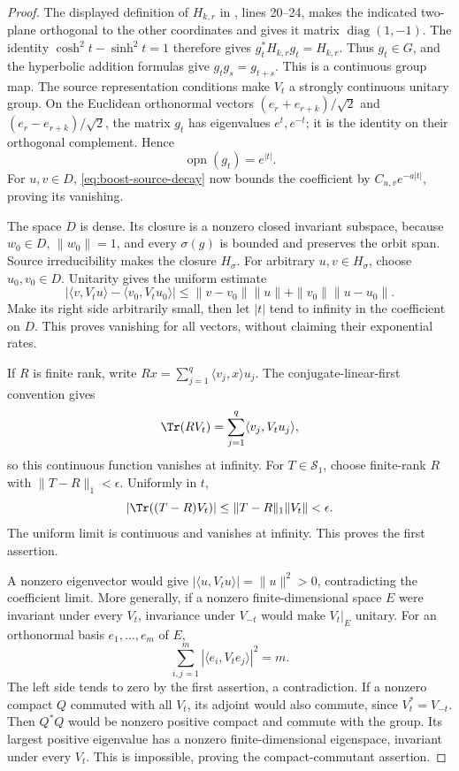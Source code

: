 \begin{proof}
The displayed definition of \(H_{k,r}\) in
, lines 20--24,
makes the indicated two-plane orthogonal to the other coordinates
and gives it matrix \(\operatorname{diag}(1,-1)\).
The identity \(\cosh^2t-\sinh^2t=1\) therefore gives
\(g_t^*H_{k,r}g_t=H_{k,r}\). Thus \(g_t\in G\), and the
hyperbolic addition formulas give \(g_tg_s=g_{t+s}\).
This is a continuous group map. The source representation
conditions make \(V_t\) a strongly continuous unitary group.
On the Euclidean orthonormal vectors
\((e_r+e_{r+k})/\sqrt2\) and
\((e_r-e_{r+k})/\sqrt2\), the matrix \(g_t\) has eigenvalues
\(e^t,e^{-t}\); it is the identity on their orthogonal
complement. Hence
\[
 \operatorname{opn}(g_t)=e^{|t|}.
\]
For \(u,v\in D\), \eqref{eq:boost-source-decay} now bounds the
coefficient by \(C_{u,v}e^{-a|t|}\), proving its vanishing.

The space \(D\) is dense. Its closure is a nonzero closed
invariant subspace, because \(w_0\in D\), \(\|w_0\|=1\),
and every \(\sigma(g)\) is bounded and preserves the orbit
span. Source irreducibility makes the closure \(H_\sigma\).
For arbitrary \(u,v\in H_\sigma\), choose \(u_0,v_0\in D\).
Unitarity gives the uniform estimate
\[
 |\langle v,V_tu\rangle-\langle v_0,V_tu_0\rangle|
 \le\|v-v_0\|\|u\|+\|v_0\|\|u-u_0\|.
\]
Make its right side arbitrarily small, then let \(|t|\) tend
to infinity in the coefficient on \(D\). This proves vanishing
for all vectors, without claiming their exponential rates.

If \(R\) is finite rank, write
\(Rx=\sum_{j=1}^q\langle v_j,x\rangle u_j\).
The conjugate-linear-first convention gives
\[
 \Tr(RV_t)=\sum_{j=1}^q\langle v_j,V_tu_j\rangle,
\]
so this continuous function vanishes at infinity.
For \(T\in\mathcal S_1\), choose finite-rank \(R\) with
\(\|T-R\|_1<\epsilon\). Uniformly in \(t\),
\[
 |\Tr((T-R)V_t)|\le\|T-R\|_1\|V_t\|<\epsilon.
\]
The uniform limit is continuous and vanishes at infinity.
This proves the first assertion.

A nonzero eigenvector would give
\(|\langle u,V_tu\rangle|=\|u\|^2>0\), contradicting the
coefficient limit. More generally, if a nonzero finite-dimensional
space \(E\) were invariant under every \(V_t\), invariance under
\(V_{-t}\) would make \(V_t|_E\) unitary. For an orthonormal
basis \(e_1,\ldots,e_m\) of \(E\),
\[
 \sum_{i,j=1}^m|\langle e_i,V_te_j\rangle|^2=m.
\]
The left side tends to zero by the first assertion, a
contradiction. If a nonzero compact \(Q\) commuted with all
\(V_t\), its adjoint would also commute, since \(V_t^*=V_{-t}\).
Then \(Q^*Q\) would be nonzero positive compact and commute
with the group. Its largest positive eigenvalue has a nonzero
finite-dimensional eigenspace, invariant under every \(V_t\).
This is impossible, proving the compact-commutant assertion.


\end{proof}

